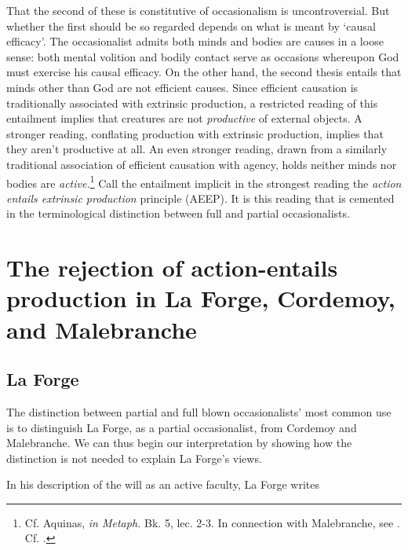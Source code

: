 That the second of these is constitutive of occasionalism is uncontroversial. But whether the first should be so regarded depends on what is meant by `causal efficacy'. The occasionalist admits both minds and bodies are causes in a loose sense: both mental volition and bodily contact serve as occasions whereupon God must exercise his causal efficacy. On the other hand, the second thesis entails that minds other than God are not efficient causes. Since efficient causation is traditionally associated with extrinsic production, a restricted reading of this entailment implies that creatures are not \emph{productive} of external objects. A stronger reading, conflating production with extrinsic production, implies that they aren't productive at all. An even stronger reading, drawn from a similarly traditional association of efficient causation with agency, holds neither minds nor bodies are \emph{active.}\footnote{Cf. Aquinas, \emph{in Metaph.} Bk. 5, lec. 2-3. In connection with Malebranche, see \autocite[255-256]{Baker2005}. Cf. \autocite{Garber1987}.} Call the entailment implicit in the strongest reading the \emph{action entails extrinsic production} principle (AEEP). It is this reading that is cemented in the terminological distinction between full and partial occasionalists. 
\section{The rejection of action-entails production in La Forge, Cordemoy, and Malebranche}
\subsection{La Forge}
The distinction between partial and full blown occasionalists' most common use is to distinguish La Forge, as a partial occasionalist, from Cordemoy and Malebranche. We can thus begin our interpretation by showing how the distinction is not needed to explain La Forge's views.

In his description of the will as an active faculty, La Forge writes

